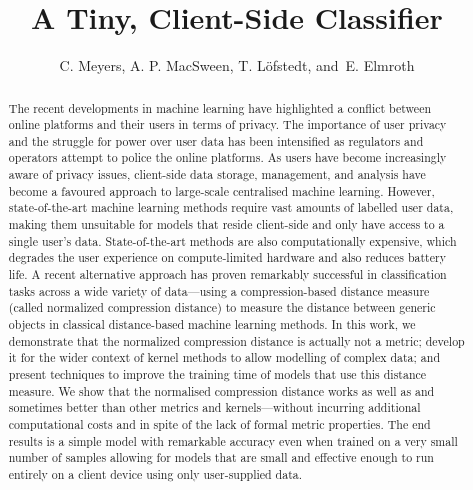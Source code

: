 \documentclass[preprint,12pt]{article}
\begin{document}
\title{A Tiny, Client-Side Classifier}


\author{C. Meyers, A. P. MacSween, T. L\"{o}fstedt, and~E. Elmroth}

\maketitle


\begin{abstract}
The recent developments in machine learning have highlighted a conflict between online platforms and their users in terms of privacy. 
The importance of user privacy and the struggle for power over user data has been intensified as regulators and operators attempt to police the online platforms.
As users have become increasingly aware of privacy issues, client-side data storage, management, and analysis have become a favoured approach to large-scale centralised machine learning.
However, state-of-the-art machine learning methods require vast amounts of labelled user data, making them unsuitable for models that reside client-side and only have access to a single user's data.
State-of-the-art methods are also computationally expensive, which degrades the user experience on compute-limited hardware and also reduces battery life.
A recent alternative approach has proven remarkably successful in classification tasks across a wide variety of data---using a compression-based distance measure (called normalized compression distance) to measure the distance between generic objects in classical distance-based machine learning methods.
In this work, we demonstrate that the normalized compression distance is actually not a metric; develop it for the wider context of kernel methods to allow modelling of complex data; and present techniques to improve the training time of models that use this distance measure.
We show that the normalised compression distance works as well as and sometimes better than other metrics and kernels---without incurring additional computational costs and in spite of the lack of formal metric properties.
The end results is a simple model with remarkable accuracy even when trained on a very small number of samples allowing for models that are small and effective enough to run entirely on a client device using only user-supplied data.
\end{abstract}
\end{document}
